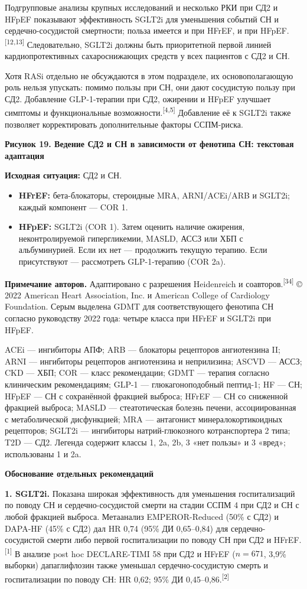 \documentclass[11pt,a4paper]{article}
\newcommand{\src}[1]{\textsuperscript{[#1]}}
\newcommand{\heading}[1]{\par\medskip\textbf{#1}\par}
\begin{document}
Подгрупповые анализы крупных исследований и несколько РКИ при СД2 и HFpEF показывают эффективность SGLT2i для уменьшения событий СН и сердечно-сосудистой смертности; польза имеется и при HFrEF, и при HFpEF.\src{12,13} Следовательно, SGLT2i должны быть приоритетной первой линией кардиопротективных сахароснижающих средств у всех пациентов с СД2 и СН.

Хотя RASi отдельно не обсуждаются в этом подразделе, их основополагающую роль нельзя упускать: помимо пользы при СН, они дают сосудистую пользу при СД2. Добавление GLP-1-терапии при СД2, ожирении и HFpEF улучшает симптомы и функциональные возможности.\src{4,5} Добавление её к SGLT2i также позволяет корректировать дополнительные факторы ССПМ-риска.

\heading{Рисунок 19. Ведение СД2 и СН в зависимости от фенотипа СН: текстовая адаптация}
\textbf{Исходная ситуация:} СД2 и СН.
\begin{itemize}
\item \textbf{HFrEF:} бета-блокаторы, стероидные MRA, ARNI/ACEi/ARB и SGLT2i; каждый компонент --- COR 1.
\item \textbf{HFpEF:} SGLT2i (COR 1). Затем оценить наличие ожирения, неконтролируемой гипергликемии, MASLD, АССЗ или ХБП с альбуминурией. Если их нет --- продолжить текущую терапию. Если присутствуют --- рассмотреть GLP-1-терапию (COR 2a).
\end{itemize}
\textbf{Примечание авторов.} Адаптировано с разрешения Heidenreich и соавторов.\src{34} © 2022 American Heart Association, Inc. и American College of Cardiology Foundation. Серым выделена GDMT для соответствующего фенотипа СН согласно руководству 2022 года: четыре класса при HFrEF и SGLT2i при HFpEF.

ACEi --- ингибиторы АПФ; ARB --- блокаторы рецепторов ангиотензина II; ARNI --- ингибиторы рецепторов ангиотензина и неприлизина; ASCVD --- АССЗ; CKD --- ХБП; COR --- класс рекомендации; GDMT --- терапия согласно клиническим рекомендациям; GLP-1 --- глюкагоноподобный пептид-1; HF --- СН; HFpEF --- СН с сохранённой фракцией выброса; HFrEF --- СН со сниженной фракцией выброса; MASLD --- стеатотическая болезнь печени, ассоциированная с метаболической дисфункцией; MRA --- антагонист минералокортикоидных рецепторов; SGLT2i --- ингибиторы натрий-глюкозного котранспортера 2 типа; T2D --- СД2. Легенда содержит классы 1, 2a, 2b, 3 «нет пользы» и 3 «вред»; использованы 1 и 2a.

\heading{Обоснование отдельных рекомендаций}
\textbf{1. SGLT2i.} Показана широкая эффективность для уменьшения госпитализаций по поводу СН и сердечно-сосудистой смерти на стадии ССПМ 4 при СД2 и СН с любой фракцией выброса. Метаанализ EMPEROR-Reduced (50\% с СД2) и DAPA-HF (45\% с СД2) дал HR 0,74 (95\% ДИ 0,65--0,84) для сердечно-сосудистой смерти либо первой госпитализации по поводу СН при СД2 и HFrEF.\src{1} В анализе post hoc DECLARE-TIMI 58 при СД2 и HFrEF ($n=671$, 3,9\% выборки) дапаглифлозин также уменьшал сердечно-сосудистую смерть и госпитализации по поводу СН: HR 0,62; 95\% ДИ 0,45--0,86.\src{2}
\end{document}
